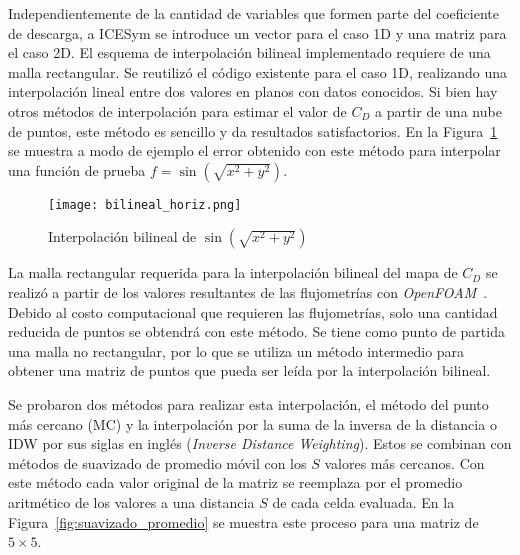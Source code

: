 
Independientemente de la cantidad de variables que formen parte del coeficiente
de descarga, a ICESym se introduce un vector para el caso 1D y una matriz para
el caso 2D.
%
El esquema de interpolación bilineal implementado requiere de una malla
rectangular.
%
Se reutilizó el código existente para el caso 1D, realizando una interpolación
lineal entre dos valores en planos con datos conocidos.
%
Si bien hay otros métodos de interpolación para estimar el valor de $C_D$ a
partir de una nube de puntos, este método es sencillo y da resultados
satisfactorios.
%
En la Figura~\ref{fig:bilineal} se muestra a modo de ejemplo el error obtenido
con este método para interpolar una función de prueba
$f=\sin\left(\sqrt{x^2 + y^2}\right)$.


\begin{figure}[h!]
    \centering
    \texttt{[image: bilineal\_horiz.png]}
    \caption{Interpolación bilineal de $\sin(\sqrt{x^2 + y^2})$}\label{fig:bilineal}
\end{figure}

La malla rectangular requerida para la interpolación bilineal del mapa de
$C_{D}$ se realizó a partir de los valores resultantes de las flujometrías con
\emph{OpenFOAM}~\parencite{openfoam}.
%
Debido al costo computacional que requieren las flujometrías, solo una cantidad
reducida de puntos se obtendrá con este método.
%
Se tiene como punto de partida una malla no rectangular, por lo que se utiliza
un método intermedio para obtener una matriz de puntos que pueda ser leída por
la interpolación bilineal.

Se probaron dos métodos para realizar esta interpolación, el método del punto más
cercano (MC) y la interpolación por la suma de la inversa de la distancia o IDW por
sus siglas en inglés (\emph{Inverse Distance Weighting}).
%
Estos se combinan con métodos de suavizado de promedio móvil con los $S$ valores
más cercanos.
%
Con este método cada valor original de la matriz se reemplaza por el promedio
aritmético de los valores a una distancia $S$ de cada celda evaluada.
%
En la Figura~\ref{fig:suavizado_promedio} se muestra este proceso para una
matriz de $5\times5$.

